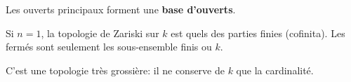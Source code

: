 \begin{proposition}{}
    Les ouverts principaux forment une \textbf{base d'ouverts}.
\end{proposition}

\begin{example}{}
    Si \(n = 1\), la topologie de Zariski sur \(k\) est quels des parties finies
    (cofinita). Les fermés sont seulement les sous-ensemble finis ou \(k\).

    C'est une topologie très grossière: il ne conserve de \(k\) que la
    cardinalité.
\end{example}


